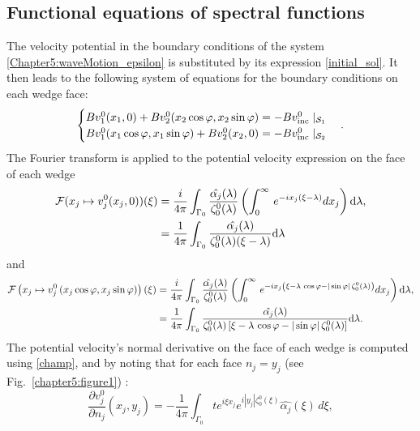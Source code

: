 \subsection{Functional equations of spectral functions}

The velocity potential in the boundary conditions of the system \eqref{Chapter5:waveMotion_epsilon} is substituted by its expression \eqref{initial_sol}. It then leads to the following system of equations for the boundary conditions on each wedge face:
\begin{equation}
\label{CL}
\begin{cases}
Bv_1^0(x_1,0) + Bv_2^0(x_2 \cos \varphi,x_2 \sin \varphi)  =  -Bv^0_{\rm inc} \mid_{\mathcal{S}_1}\\
Bv_1^0(x_1 \cos \varphi,x_1 \sin \varphi) + Bv_2^0(x_2,0)   =  -Bv^0_{\rm inc} \mid_{\mathcal{S}_2}
\end{cases}.
\end{equation}
The Fourier transform is applied to the potential velocity expression on the face of each wedge
\begin{align}
\mathcal{F}(x_j \mapsto v_j^0 (x_j,0))(\xi) & =  \dfrac{i}{4\pi} \int_{\Gamma_0}  \dfrac{\hat{\alpha_j}(\lambda)}{\zeta_0^0(\lambda)}  \left( \int_0^{\infty} \, e^{-i x_j (\xi-\lambda)} dx_j \right) {\rm d} \lambda,\\
& =  \dfrac{1}{4\pi} \int_{\Gamma_0} \dfrac{\hat{\alpha_j}(\lambda)}{\zeta_0^0(\lambda) (\xi - \lambda)} {\rm d} \lambda \nonumber
\end{align}
and
\begin{align}
\mathcal{F} \left( x_j \mapsto v_j^0 \left( x_j \cos \varphi,x_j \sin \varphi \right) \right)(\xi)  & =  \dfrac{i}{4\pi} \int_{\Gamma_0}  \dfrac{\hat{\alpha_j}(\lambda)}{\zeta_0^0(\lambda)}  \left( \int_0^{\infty} \, e^{-i x_j \left( \xi - \lambda  \, \cos \varphi - |\sin \varphi| \, \zeta_0^0(\lambda) \right)} dx_j \right) {\rm d} \lambda,\\
& = \dfrac{1}{4\pi} \int_{\Gamma_0} \dfrac{ \hat{\alpha_j}(\lambda)}{\zeta_0^0(\lambda) \left[ \xi - \lambda \, \cos \varphi  - |\sin \varphi| \, \zeta_0^0(\lambda) \right]} {\rm d} \lambda.  \nonumber
\end{align}
The potential velocity's normal derivative on the face of each wedge is computed using \eqref{champ}, and by noting that for each face $n_j=y_j$ (see Fig.~\ref{chapter5:figure1}) :
\begin{equation}
\frac{\partial v_j^0}{\partial n_j}(x_j,y_j) = -\frac{1}{4\pi} \int_{\Gamma_0} te^{i\xi x_j}e^{i|y_j|\zeta_0^0(\xi)} \hat{\alpha_j}(\xi)\, d\xi,
\end{equation}
